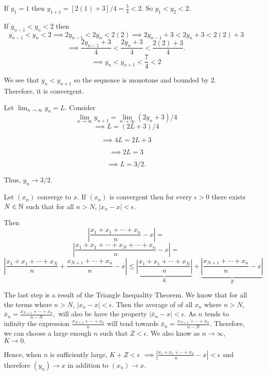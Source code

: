 \documentclass{report}
\begin{document}
\begin{myproof}

  If $y_1 = 1$ then $y_{1+1} =  [2(1) +3]/4 = \frac{5}{4} < 2.$ So $y_1 < y_2 < 2.$
    
  If $y_{n-1}<y_n<2$ then $$y_{n-1}<y_{n}<2 \implies 2y_{n-1}<2y_{n}<2(2)\implies 2y_{n-1} + 3<2y_{n} +3 <2(2) +3  $$
 $$ \implies \frac{2y_{n-1} + 3}{4}<\frac{2y_{n} +3}{4} <\frac{2(2) +3}{4}. $$
 $$ \implies y_{n} <y_{n+1} <\frac{7}{4} < 2$$

We see that $y_n < y_{n+1}$ so the sequence is monotone and bounded by $2.$  Therefore, it is convergent.
\par
Let $\lim_{n \rightarrow \infty} y_{n} = L$. Consider $$\lim_{n \rightarrow \infty} y_{n+1} = \lim_{n \rightarrow \infty}\left(2 y_n+3\right) / 4$$ 
$$\implies L = \left(2 L+3\right) / 4$$ 

$$\implies 4L = 2 L+3$$ 

$$\implies 2L = 3$$ 

$$\implies L = 3/2.$$ 

Thus, ${y_n} \rightarrow 3/2.$
\end{myproof}
\pagebreak

\bigskip
\begin{myproof}
    
  Let $(x_n)$ converge to $x$. If $(x_n)$ is convergent then for every $\epsilon >0$ there exists $N \in \NN$ such that for all $n > N$, $| x_{n} - x| < \epsilon.$

  Then $$ \left| \frac{x_1 + x_1 +\cdots + x_{n} }{n}  - x\right|= $$$$ \left| \frac{x_1 + x_1 + \cdots + x_{N}+ \cdots + x_{n} }{n}  - x\right|= $$
$$ \left| \frac{x_1 + x_1 + \cdots + x_{N}}{n} + \frac{ x_{N+1}+ \cdots + x_{n} }{n} - x\right| \leq \underbrace{\left| \frac{x_1 + x_1 + \cdots + x_{N}}{n} \right|}_{K}+ \underbrace{ \left|\frac{ x_{N + 1}+ \cdots + x_{n} }{n} - x\right|}_{Z}$$

The last step is a result of the Triangle Inequality Theorem. We know that for all the terms where $n>N$, $| x_{n} - x| < \epsilon.$ Then the average of of all $x_n$ where $n>N$, $ \bar{x}_n =\frac{ x_{N + 1}+ \cdots + x_{n} }{n-N},$ will also be have the property $|\bar{x}_n - x| < \epsilon$.  As $n$ tends to infinity the expression $\frac{ x_{N + 1} + \cdots + x_{n} }{n}$  will tend towards $ \bar{x}_n =\frac{ x_{N + 1}+ \cdots + x_{n} }{n-N}.$ Therefore, we can choose a large enough $n$ such that $Z < \epsilon.$ We also know as $n \rightarrow \infty $, $K \rightarrow 0.$

Hence, when $n$ is sufficiently large, $K + Z <\epsilon$
$  \implies\left| \frac{x_1 + x_1 +\cdots + x_{n} }{n}  - x\right|< \epsilon$ and therefore $(y_n) \rightarrow x$ in addition to $(x_n) \rightarrow x.$
\bigskip
\end{myproof}
\end{document}
